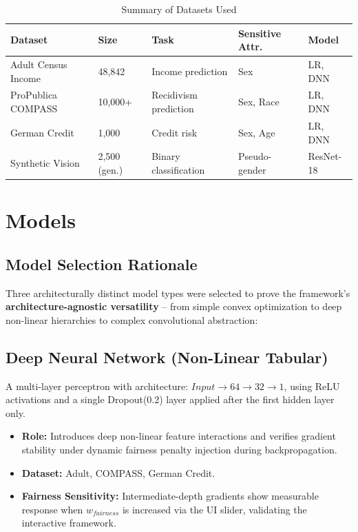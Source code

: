 \documentclass[12pt,a4paper]{article}
\begin{document}
\begin{table}[h]
\centering
\caption{Summary of Datasets Used}
\begin{tabular}{lllll}
\toprule
\textbf{Dataset} & \textbf{Size} & \textbf{Task} & \textbf{Sensitive Attr.} & \textbf{Model} \\
\midrule
Adult Census Income & 48,842 & Income prediction & Sex & LR, DNN \\
ProPublica COMPASS & 10,000+ & Recidivism prediction & Sex, Race & LR, DNN \\
German Credit & 1,000 & Credit risk & Sex, Age & LR, DNN \\
Synthetic Vision & 2,500 (gen.) & Binary classification & Pseudo-gender & ResNet-18 \\
\bottomrule
\end{tabular}
\end{table}

\section{Models}

\subsection{Model Selection Rationale}

Three architecturally distinct model types were selected to prove the framework's \textbf{architecture-agnostic versatility} -- from simple convex optimization to deep non-linear hierarchies to complex convolutional abstraction:


\subsection{Deep Neural Network (Non-Linear Tabular)}

A multi-layer perceptron with architecture: $Input \rightarrow 64 \rightarrow 32 \rightarrow 1$, using ReLU activations and a single Dropout(0.2) layer applied after the first hidden layer only.

\begin{itemize}
    \item \textbf{Role:} Introduces deep non-linear feature interactions and verifies gradient stability under dynamic fairness penalty injection during backpropagation.
    \item \textbf{Dataset:} Adult, COMPASS, German Credit.
    \item \textbf{Fairness Sensitivity:} Intermediate-depth gradients show measurable response when $w_{fairness}$ is increased via the UI slider, validating the interactive framework.
\end{itemize}
\end{document}

